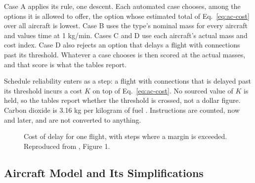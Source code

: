 Case A applies its rule, one descent. Each automated case chooses, among the options it is allowed to offer, the option whose estimated total of Eq.~\ref{eq:ac-cost} over all aircraft is lowest. Case B uses the type's nominal mass for every aircraft and values time at 1 kg/min. Cases C and D use each aircraft's actual mass and cost index. Case D also rejects an option that delays a flight with connections past its threshold. Whatever a case chooses is then scored at the actual masses, and that score is what the tables report.

Schedule reliability enters as a step: a flight with connections that is delayed past its threshold incurs a cost $K$ on top of Eq.~\ref{eq:ac-cost}. No sourced value of $K$ is held, so the tables report whether the threshold is crossed, not a dollar figure. Carbon dioxide is 3.16 kg per kilogram of fuel \cite{icao2024icecMethodology}. Instructions are counted, now and later, and are not converted to anything.


\begin{figure}[htbp]
\centering
{}
\caption{Cost of delay for one flight, with steps where a margin is exceeded. Reproduced from \cite{pilon2019udppMargins}, Figure 1.}
\label{fig:cost-of-delay}
\end{figure}

\subsection{Aircraft Model and Its Simplifications}
\label{sec:scoring-limits}


